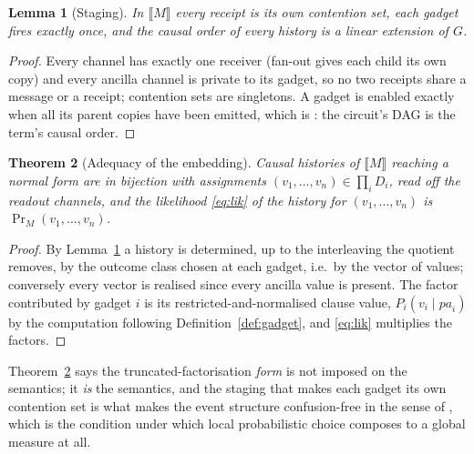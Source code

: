 \documentclass[11pt,a4paper]{article}
\theoremstyle{plain}
\newtheorem{theorem}{Theorem}[section]
\newtheorem{lemma}[theorem]{Lemma}
\theoremstyle{definition}
\theoremstyle{remark}
\newcommand{\sem}[1]{\llbracket #1 \rrbracket}
\begin{document}
\begin{lemma}[Staging]\label{lem:staging}
In $\sem{M}$ every receipt is its own contention set, each gadget fires exactly
once, and the causal order of every history is a linear extension of $G$.
\end{lemma}

\begin{proof}
Every channel has exactly one receiver (fan-out gives each child its own copy)
and every ancilla channel is private to its gadget, so no two receipts share a
message or a receipt; contention sets are singletons. A gadget is enabled
exactly when all its parent copies have been emitted, which is
\cite[Prop.~8.3]{GradedV4}: the circuit's DAG is the term's causal order.
\end{proof}

\begin{theorem}[Adequacy of the embedding]\label{thm:adequacy}
Causal histories of $\sem{M}$ reaching a normal form are in bijection with
assignments $(v_1,\dots,v_n) \in \prod_i D_i$, read off the readout channels,
and the likelihood \eqref{eq:lik} of the history for $(v_1,\dots,v_n)$ is
$\Pr_M(v_1,\dots,v_n)$.
\end{theorem}

\begin{proof}
By Lemma~\ref{lem:staging} a history is determined, up to the interleaving the
quotient removes, by the outcome class chosen at each gadget, i.e.\ by the
vector of values; conversely every vector is realised since every ancilla value
is present. The factor contributed by gadget $i$ is its restricted-and-normalised
clause value, $P_i(v_i \mid \mathit{pa}_i)$ by the computation following
Definition~\ref{def:gadget}, and \eqref{eq:lik} multiplies the factors.
\end{proof}

Theorem~\ref{thm:adequacy} says the truncated-factorisation \emph{form} is not
imposed on the semantics; it \emph{is} the semantics, and the staging that makes
each gadget its own contention set is what makes the event structure
confusion-free in the sense of \cite{VaraccaVolzerWinskel}, which is the
condition under which local probabilistic choice composes to a global measure
at all.
\end{document}
